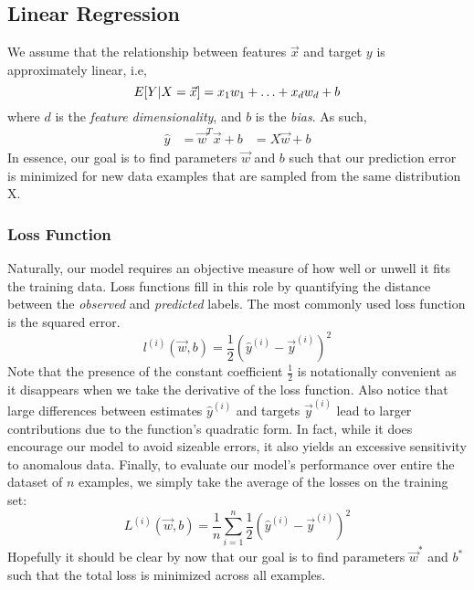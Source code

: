 \documentclass[a4paper,12pt]{article}
\theoremstyle{definition}
\begin{document}
\subsection*{Linear Regression}
    We assume that the relationship between features $\vec{x}$ and target $y$ is approximately linear, i.e,
    \begin{equation}
        E[Y|X=\vec{x}] = x_1w_1 + \ldots + x_dw_d + b \\
    \end{equation}
    where $d$ is the \textit{feature dimensionality}, and $b$ is the \textit{bias}. As such,
    \begin{equation}
        \begin{aligned}
        \hat{y} &= \vec{w}^T\vec{x} + b
                &= X\vec{w} + b
        \end{aligned}
    \end{equation}
    In essence, our goal is to find parameters $\vec{w}$ and $b$ such that our prediction error is 
    minimized for new data examples that are sampled from the same distribution X.

    \subsubsection*{Loss Function}
    Naturally, our model requires an objective measure of how well or unwell it fits the training data.
    Loss functions fill in this role by quantifying the distance between the \textit{observed} and \textit{predicted}
    labels. The most commonly used loss function is the squared error.
    \begin{equation}
        l^{(i)}(\vec{w},b) = \frac{1}{2}(\hat{y}^{(i)}-\vec{y}^{(i)})^2
    \end{equation}
    Note that the presence of the constant coefficient $\frac{1}{2}$ is notationally convenient as it disappears when we
    take the derivative of the loss function. Also notice that large differences between estimates $\hat{y}^{(i)}$ 
    and targets $\vec{y}^{(i)}$ lead to larger contributions due to the function's quadratic form. In fact, while
    it does encourage our model to avoid sizeable errors, it also yields an excessive sensitivity to anomalous data.
    Finally, to evaluate our model's performance over entire the dataset of $n$ examples, we simply take the average of 
    the losses on the training set:
    \begin{equation}
        L^{(i)}(\vec{w},b) = \frac{1}{n}\sum_{i=1}^{n}\frac{1}{2}(\hat{y}^{(i)}-\vec{y}^{(i)})^2
    \end{equation}
    Hopefully it should be clear by now that our goal is to find parameters $\vec{w}^*$ and $b^*$ such that 
    the total loss is minimized across all examples.
\end{document}
